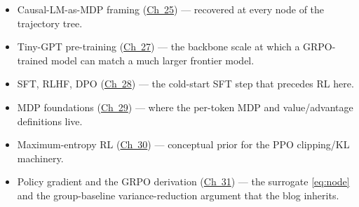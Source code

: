 \documentclass[11pt]{article}
\begin{document}
\begin{itemize}
\item Causal-LM-as-MDP framing
  (\href{https://github.com/pleyva2004/first-principles-to-llms/tree/main/Chapter\%2025}{Ch~25})
  --- recovered at every node of the trajectory tree.
\item Tiny-GPT pre-training
  (\href{https://github.com/pleyva2004/first-principles-to-llms/tree/main/Chapter\%2027}{Ch~27})
  --- the backbone scale at which a GRPO-trained model can match a much
  larger frontier model.
\item SFT, RLHF, DPO
  (\href{https://github.com/pleyva2004/first-principles-to-llms/tree/main/Chapter\%2028}{Ch~28})
  --- the cold-start SFT step that precedes RL here.
\item MDP foundations
  (\href{https://github.com/pleyva2004/first-principles-to-llms/tree/main/Chapter\%2029}{Ch~29})
  --- where the per-token MDP and value/advantage definitions live.
\item Maximum-entropy RL
  (\href{https://github.com/pleyva2004/first-principles-to-llms/tree/main/Chapter\%2030}{Ch~30})
  --- conceptual prior for the PPO clipping/KL machinery.
\item Policy gradient and the GRPO derivation
  (\href{https://github.com/pleyva2004/first-principles-to-llms/tree/main/Chapter\%2031}{Ch~31})
  --- the surrogate \eqref{eq:node} and the group-baseline variance-reduction
  argument that the blog inherits.
\end{itemize}



\end{document}
